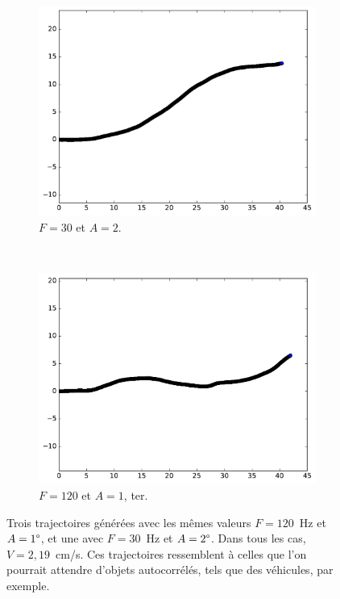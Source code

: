 \begin{figure}[!htb]
\begin{subfigure}[t]{0.49\textwidth}
			\centering
			\includegraphics[width=\textwidth]{figures/ch4/ac_2_19_2_30}
			\caption[Mouvement pseudo-autocorrélé B]{$F = 30$ et $A = 2$.}
			\label{fig:ac_2_30}
		\end{subfigure}		
		~
		\begin{subfigure}[t]{0.49\textwidth}
			\centering
			\includegraphics[width=\textwidth]{figures/ch4/ac_2_19_2_60}
			\caption[Mouvement pseudo-autocorrélé B]{$F = 120$ et $A = 1$, ter.}
			\label{fig:ac_1_120C}
		\end{subfigure}
		\caption[Mouvements pseudo-autocorrélés]{Trois trajectoires générées avec les mêmes valeurs $F = 120$~Hz et $A = 1\degree$, et une avec $F = 30$~Hz et $A = 2\degree$. Dans tous les cas, $V = 2,19$~cm/s. Ces trajectoires ressemblent à celles que l'on pourrait attendre d'objets autocorrélés, tels que des véhicules, par exemple.}
		\label{fig:autocorr}
	\end{figure}
    
